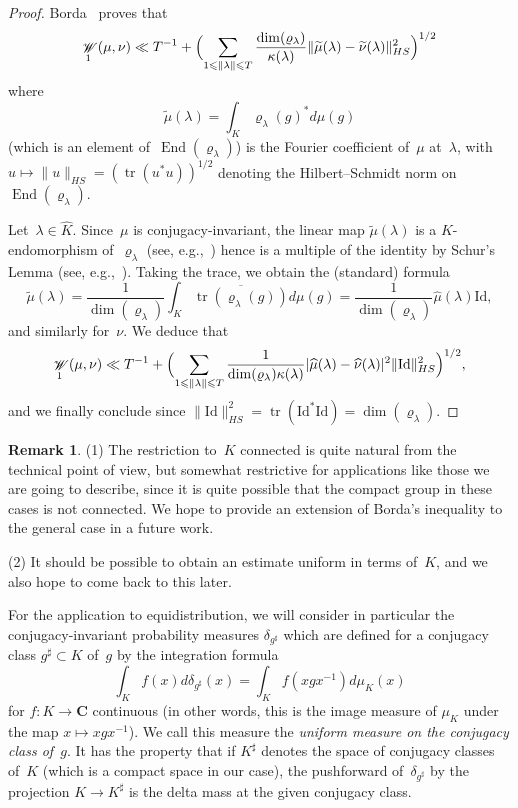 \documentclass[12pt]{amsart}
\renewcommand{\mathcal}{\mathscr}
\renewcommand{\leq}{\leqslant}
\newcommand{\Cc}{\mathbf{C}}
\DeclareMathOperator{\wass}{\mathcal{W}}
\DeclareMathOperator{\Tr}{tr}
\DeclareMathOperator{\End}{End}
\renewcommand{\rho}{\varrho}
\theoremstyle{plain}
\theoremstyle{remark}
\theoremstyle{definition}
\newtheorem{remark}[theorem]{Remark}
\renewcommand{\leq}{\leqslant}
\begin{document}
\begin{proof}
  Borda~\cite[Th.\,1]{borda_berry_esseen} proves that
  \[
    \wass_1(\mu,\nu)\ll T^{-1}+\Bigl( \sum_{1\leq \|\lambda\|\leq
      T} \frac{\dim(\rho_{\lambda})}{\kappa(\lambda)}
    \|\widetilde{\mu}(\lambda)-\widetilde{\nu}(\lambda)\|_{HS}^2
    \Bigr)^{1/2}
  \]
  where 
  \[
    \widetilde{\mu}(\lambda)=\int_K\rho_{\lambda}(g)^*d\mu(g)
  \]
  (which is an element of~$\End(\rho_{\lambda})$) is the Fourier
  coefficient of~$\mu$ at~$\lambda$,
  with~$u\mapsto\|u\|_{HS}=(\Tr(u^*u))^{1/2}$ denoting the
  Hilbert--Schmidt norm on~$\End(\rho_{\lambda})$.

  Let~$\lambda\in\widehat{K}$.  Since~$\mu$ is conjugacy-invariant, the
  linear map $\widetilde{\mu}(\lambda)$ is a $K$-endomorphism
  of~$\rho_{\lambda}$ (see, e.g.,~\cite[p.\,402]{ts345}) hence is a
  multiple of the identity by Schur's Lemma (see,
  e.g.,~\cite[p.\,386,\,prop.\,6]{ts345}). Taking the trace, we obtain
  the (standard) formula
  \[
    \widetilde{\mu}(\lambda)=\frac{1}{\dim(\rho_{\lambda})}
    \int_K\overline{\Tr(\rho_{\lambda}(g))}d\mu(g)=
    \frac{1}{\dim(\rho_{\lambda})}\widehat{\mu}(\lambda) \mathrm{Id},
  \]
  and similarly for~$\nu$. We deduce that
  \[
    \wass_1(\mu,\nu)\ll T^{-1}+\Bigl( \sum_{1\leq \|\lambda\|\leq T}
    \frac{1}{\dim(\rho_{\lambda})\kappa(\lambda)}
    |\widehat{\mu}(\lambda)-\widehat{\nu}(\lambda)|^2\|\mathrm{Id}\|_{HS}^2
    \Bigr)^{1/2},
  \]
  and we finally conclude since
  $\|\mathrm{Id}\|_{HS}^2=\Tr(\mathrm{Id}^*\mathrm{Id})=\dim(\rho_{\lambda})$.
\end{proof}


\begin{remark}
  (1) The restriction to~$K$ connected is quite natural from the
  technical point of view, but somewhat restrictive for applications
  like those we are going to describe, since it is quite possible that
  the compact group in these cases is not connected.  We hope to
  provide an extension of Borda's inequality to the general case in a
  future work.

  (2) It should be possible to obtain an estimate uniform in terms
  of~$K$, and we also hope to come back to this later.
\end{remark}

For the application to equidistribution, we will consider in particular
the conjugacy-invariant probability measures $\delta_{g^{\sharp}}$ which
are defined for a conjugacy class $g^{\sharp}\subset K$ of~$g$ by the
integration formula
\[
  \int_K f(x)d\delta_{g^{\sharp}}(x)=\int_Kf(xgx^{-1})d\mu_K(x)
\]
for $f\colon K\to\Cc$ continuous (in other words, this is the image
measure of $\mu_K$ under the map $x\mapsto xgx^{-1}$). We call this
measure the \emph{uniform measure on the conjugacy class of~$g$}.  It
has the property that if $K^{\sharp}$ denotes the space of conjugacy
classes of~$K$ (which is a compact space in our case), the pushforward
of~$\delta_{g^{\sharp}}$ by the projection $K\to K^{\sharp}$ is the
delta mass at the given conjugacy class.
\end{document}
